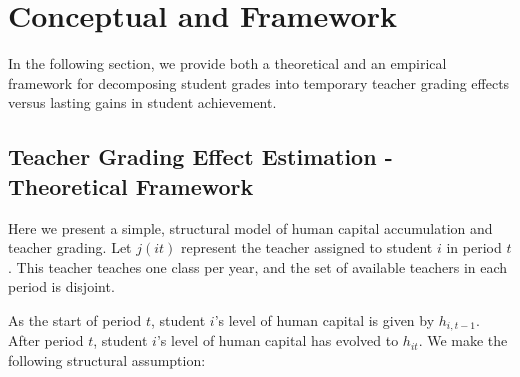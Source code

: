 \documentclass[../thesis_main.tex]{subfiles}
\begin{document}
\doublespacing
\section{Conceptual and Framework}
\label{section:framework}

In the following section, we provide both a theoretical and an empirical framework for decomposing student grades into temporary teacher grading effects versus lasting gains in student achievement. 

\subsection{Teacher Grading Effect Estimation - Theoretical Framework}

Here we present a simple, structural model of human capital accumulation and teacher grading. Let $j(it)$ represent the teacher assigned to student $i$ in period $t$. This teacher teaches one class per year, and the set of available teachers in each period is disjoint.

As the start of period $t$, student $i$'s level of human capital is given by $h_{i,t-1}$. After period $t$, student $i$'s level of human capital has evolved to $h_{it}$. We make the following structural assumption:

\bigskip 
\noindent{}\\

\end{document}

